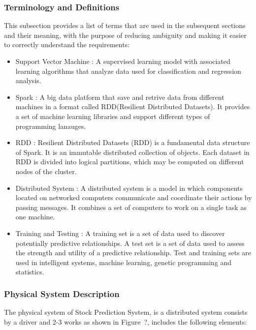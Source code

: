 \documentclass[12pt]{article}
\newcommand{\progname}{Stock Prediction System} %
\begin{document}
\subsubsection{Terminology and  Definitions}

This subsection provides a list of terms that are used in the subsequent
sections and their meaning, with the purpose of reducing ambiguity and making it
easier to correctly understand the requirements:

\begin{itemize}

\item Support Vector Machine  :
A supervised learning model with associated learning algorithms that analyze
data used for classification and regression analysis. 
\item Spark :
A big data platform that save and retrive data from different machines in a format called RDD(Resilient Distributed Datasets). It provides a set of machine learning libraries and support different types of programming lanauges. 
\item RDD :
Resilient Distributed Datasets (RDD) is a fundamental data structure of Spark. It is an immutable distributed collection of objects. Each dataset in RDD is divided into logical partitions, which may be computed on different nodes of the cluster.
\item Distributed System :
A distributed system is a model in which components located on networked computers communicate and coordinate their actions by passing messages. It combines a set of computers to work on a single task as one machine.
\item Training and Testing :
A training set is a set of data used to discover potentially predictive relationships. A test set is a set of data used to assess the strength and utility of a predictive relationship. Test and training sets are used in intelligent systems, machine learning, genetic programming and statistics.

\end{itemize}

\subsubsection{Physical System Description}

The physical system of \progname{}, is a distributed system consists by a driver
and 2-3 works as shown in Figure~?, 
includes the following elements:
\end{document}
